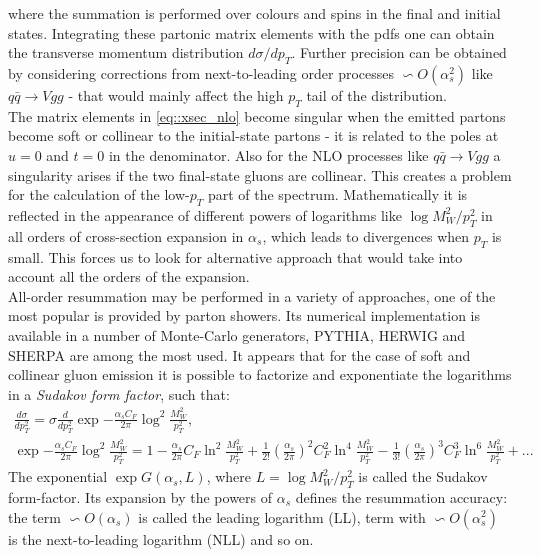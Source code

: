 	 
	 where the summation is performed over colours and spins in the final and initial states. Integrating these partonic matrix elements with the \gls{pdf}s one can obtain the transverse momentum distribution $d\sigma/dp_T$. Further precision can be obtained by considering corrections from next-to-leading order processes $\backsim O(\alpha_s^2)$ like $q \bar q \rightarrow Vgg$ - that would mainly affect the high $p_T$ tail of the distribution. \\
	 The matrix elements in \ref{eq::xsec_nlo} become singular when the emitted partons become soft or collinear to the initial-state partons - it is related to the poles at $u=0$ and $t = 0$ in the denominator. Also for the NLO processes like $q \bar q \rightarrow Vgg$ a singularity arises if the two final-state gluons are collinear. This creates a problem for the calculation of the low-$p_T$ part of the spectrum. Mathematically it is reflected in the appearance of different powers of logarithms like $\log{M^2_W/p^2_T}$ in all orders of cross-section expansion in $\alpha_s$, which leads to divergences when $p_T$ is small. This forces us to look for alternative approach that would take into account all the orders of the expansion.\\
	 All-order resummation may be performed in a variety of approaches, one of the most popular is provided by parton showers. Its numerical implementation is available in a number of Monte-Carlo generators, PYTHIA, HERWIG and SHERPA are among the most used. It appears that for the case of soft and collinear gluon emission it is possible to factorize and exponentiate the logarithms in a \textit{Sudakov form factor}, such that:
	 	\begin{equation}
	 		\begin{array}{lcl} 
		\frac{d\sigma}{dp_T^2}=\sigma\frac{d}{dp_T^2}\exp{-\frac{\alpha_s C_F}{2\pi}\log^2{\frac{M_W^2}{p_T^2}}},\\
		\exp{-\frac{\alpha_s C_F}{2\pi}\log^2{\frac{M_W^2}{p_T^2}}}=1-\frac{\alpha_s}{2\pi}C_F\ln^2{\frac{M_W^2}{p_T^2}}+\frac{1}{2!}\left(\frac{\alpha_s}{2\pi}\right)^2C^2_F\ln^4{\frac{M_W^2}{p_T^2}}-\frac{1}{3!}\left(\frac{\alpha_s}{2\pi}\right)^3C^3_F\ln^6{\frac{M_W^2}{p_T^2}}+...
				 \end{array}
	 \end{equation}	
	 The exponential $\exp{G(\alpha_s,L)}$, where $L=\log{M^2_W/p^2_T}$ is called the Sudakov form-factor. Its expansion by the powers of $\alpha_s$ defines the resummation accuracy: the term $\backsim O(\alpha_s)$ is called the leading logarithm (LL), term with $ \backsim O(\alpha_s^2)$ is the next-to-leading logarithm (NLL) and so on. \\
